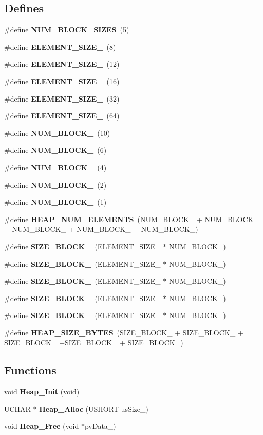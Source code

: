 \subsection*{Defines}
\begin{DoxyCompactItemize}
\item 
\#define {\bf NUM\_\-BLOCK\_\-SIZES}~(5)
\item 
\#define {\bf ELEMENT\_\-SIZE\_}~(8)
\item 
\#define {\bf ELEMENT\_\-SIZE\_}~(12)
\item 
\#define {\bf ELEMENT\_\-SIZE\_}~(16)
\item 
\#define {\bf ELEMENT\_\-SIZE\_}~(32)
\item 
\#define {\bf ELEMENT\_\-SIZE\_}~(64)
\item 
\#define {\bf NUM\_\-BLOCK\_}~(10)
\item 
\#define {\bf NUM\_\-BLOCK\_}~(6)
\item 
\#define {\bf NUM\_\-BLOCK\_}~(4)
\item 
\#define {\bf NUM\_\-BLOCK\_}~(2)
\item 
\#define {\bf NUM\_\-BLOCK\_}~(1)
\item 
\#define {\bf HEAP\_\-NUM\_\-ELEMENTS}~(NUM\_\-BLOCK\_ + NUM\_\-BLOCK\_ + NUM\_\-BLOCK\_ + NUM\_\-BLOCK\_ + NUM\_\-BLOCK\_)
\item 
\#define {\bf SIZE\_\-BLOCK\_}~(ELEMENT\_\-SIZE\_ $\ast$ NUM\_\-BLOCK\_)
\item 
\#define {\bf SIZE\_\-BLOCK\_}~(ELEMENT\_\-SIZE\_ $\ast$ NUM\_\-BLOCK\_)
\item 
\#define {\bf SIZE\_\-BLOCK\_}~(ELEMENT\_\-SIZE\_ $\ast$ NUM\_\-BLOCK\_)
\item 
\#define {\bf SIZE\_\-BLOCK\_}~(ELEMENT\_\-SIZE\_ $\ast$ NUM\_\-BLOCK\_)
\item 
\#define {\bf SIZE\_\-BLOCK\_}~(ELEMENT\_\-SIZE\_ $\ast$ NUM\_\-BLOCK\_)
\item 
\#define {\bf HEAP\_\-SIZE\_\-BYTES}~(SIZE\_\-BLOCK\_ + SIZE\_\-BLOCK\_ + SIZE\_\-BLOCK\_ +SIZE\_\-BLOCK\_ + SIZE\_\-BLOCK\_)
\end{DoxyCompactItemize}
\subsection*{Functions}
\begin{DoxyCompactItemize}
\item 
void {\bf Heap\_\-Init} (void)
\item 
UCHAR $\ast$ {\bf Heap\_\-Alloc} (USHORT usSize\_\-)
\item 
void {\bf Heap\_\-Free} (void $\ast$pvData\_\-)
\end{DoxyCompactItemize}


